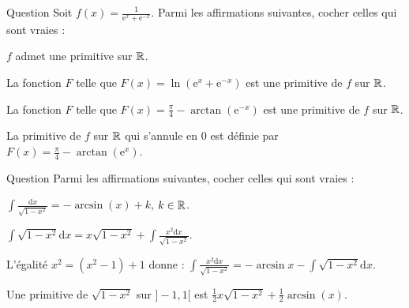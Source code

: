 \begin{multi}[multiple,feedback=
{La fonction \(f\) est continue sur \(\Rr\), donc elle y admet des primitives. Avec \(t=\mathrm{e}^{-x}\), on a : \(\mathrm{d}t=-\mathrm{e}^{-x}\, \mathrm{d}x\) et
\[\int \frac{\mathrm{d}x}{\mathrm{e}^x+\mathrm{e}^{-x}}=\int \frac{\mathrm{e}^{-x}\, \mathrm{d}x}{1+\mathrm{e}^{-2x}}=-\int \frac{\mathrm{d}t}{1+t^2}=-\arctan (t)+k=-\arctan \left(\mathrm{e}^{-x}\right)+k,\; k\in \Rr.\]
La condition \(F(0)=0\) implique que \(\displaystyle k=\frac{\pi}{4}\).
}]{Question}
Soit \(\displaystyle f(x)=\frac{1}{\mathrm{e}^x+\mathrm{e}^{-x}}\). Parmi les affirmations suivantes, cocher celles qui sont vraies :

    \item* \(f\) admet une primitive sur \(\Rr\).
    \item La fonction \(F\) telle que \(\displaystyle F(x)=\ln \left(\mathrm{e}^x+\mathrm{e}^{-x}\right)\) est une primitive de \(f\) sur \(\Rr\).
    \item* La fonction \(F\) telle que \(\displaystyle F(x)=\frac{\pi}{4}-\arctan \left(\mathrm{e}^{-x}\right)\) est une primitive de \(f\) sur \(\Rr\).
    \item La primitive de \(f\) sur \(\Rr\) qui s'annule en \(0\) est d\'efinie par \(\displaystyle F(x)=\frac{\pi}{4}-\arctan \left(\mathrm{e}^{x}\right)\).
\end{multi}


\begin{multi}[multiple,feedback=
{D'abord \(\displaystyle \int \frac{\mathrm{d}x}{\sqrt{1-x^2}}=\arcsin (x)+k\), \(k\in \Rr\). Une intégration par parties avec \(u=\sqrt{1-x^2}\) et \(v=x\) donne
\[\int \sqrt{1-x^2}\mathrm{d}x=x\sqrt{1-x^2}-\int \frac{-x^2\mathrm{d}x}{\sqrt{1-x^2}}.\]
Ensuite, en écrivant \(\displaystyle -x^2=(1-x^2)-1\), on obtient : 
\[\int \sqrt{1-x^2}\mathrm{d}x=x\sqrt{1-x^2}-\int \sqrt{1-x^2}\mathrm{d}x+\int \frac{\mathrm{d}x}{\sqrt{1-x^2}}.\]
D'où : \(\displaystyle 2\int \sqrt{1-x^2}\mathrm{d}x=x\sqrt{1-x^2}+\arcsin x+k\).
}]{Question}
Parmi les affirmations suivantes, cocher celles qui sont vraies :

    \item \(\displaystyle \int \frac{\mathrm{d}x}{\sqrt{1-x^2}}=-\arcsin (x)+k\), \(k\in \Rr\).
    \item* \(\displaystyle \int \sqrt{1-x^2}\mathrm{d}x=x\sqrt{1-x^2}+\int \frac{x^2\mathrm{d}x}{\sqrt{1-x^2}}\).
    \item L'égalité \(x^2=(x^2-1)+1\) donne : \(\displaystyle \int \frac{x^2\mathrm{d}x}{\sqrt{1-x^2}}=-\arcsin x-\int \sqrt{1-x^2}\mathrm{d}
x\).
    \item* Une primitive de \(\displaystyle \sqrt{1-x^2}\) sur \(]-1,1[\) est \(\displaystyle \frac{1}{2}x\sqrt{1-x^2}+\frac{1}{2}\arcsin (x)\).
\end{multi}


